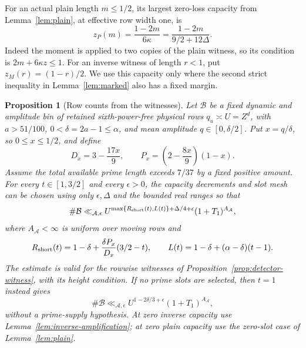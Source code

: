 \documentclass[11pt,a4paper]{article}
\numberwithin{equation}{section}
\numberwithin{figure}{section}
\newtheorem{proposition}[theorem]{Proposition}
\theoremstyle{definition}
\theoremstyle{remark}
\begin{document}
For an actual plain length \(m\le1/2\), its largest zero-loss
capacity from Lemma~\ref{lem:plain}, at effective row width one, is
\begin{equation}
 z_P(m)=\frac{1-2m}{6\kappa}
       =\frac{1-2m}{9/2+12\Delta}.
 \label{eq:plain-zero-loss-capacity}
\end{equation}
Indeed the moment is applied to two copies of the plain witness,
so its condition is \(2m+6\kappa z\le1\).
For an inverse witness of length \(r<1\), put
\(z_M(r)=(1-r)/2\).  We use this capacity only where the second
strict inequality in Lemma~\ref{lem:marked} also has a fixed margin.

\begin{proposition}[Row counts from the witnesses]\label{prop:detector-counts}
Let \(\mathcal B\) be a fixed dynamic and amplitude bin of retained
sixth-power-free physical rows \(q_u\asymp U=Z^d\), with
\(a>51/100\), \(0<\delta=2a-1\le\alpha\), and mean amplitude
\(q\in[0,\delta/2]\).  Put \(x=q/\delta\), so \(0\le x\le1/2\),
and define
\[
 D_x=3-\frac{17x}{9},\qquad
 P_x=\left(2-\frac{8x}{9}\right)(1-x).
\]
Assume the total available prime length exceeds \(7/37\) by a
fixed positive amount.  For every \(t\in[1,3/2]\) and every
\(\epsilon>0\), the capacity decrements and slot mesh can be chosen
using only \(\epsilon,\Delta\) and the bounded real ranges so that
\[
 \#\mathcal B\ll_{\mathcal A,\epsilon}
 U^{\max\{R_{\rm short}(t),L(t)\}+\Delta/4+\epsilon}
 (1+T_1)^{A_{\mathcal A}},
\]
where \(A_{\mathcal A}<\infty\) is uniform over moving rows and
\[
 R_{\rm short}(t)=1-\delta+\frac{\delta P_x}{D_x}(3/2-t),
 \qquad
 L(t)=1-\delta+(\alpha-\delta)(t-1).
\]
The estimate is valid for the rowwise witnesses of
Proposition~\ref{prop:detector-witness}, with its height condition.
If no prime slots are selected, then \(t=1\) instead gives
\[
 \#\mathcal B\ll_{\mathcal A,\epsilon}
 U^{1-2\delta/3+\epsilon}(1+T_1)^{A_{\mathcal A}},
\]
without a prime-supply hypothesis.  At zero inverse capacity use
Lemma~\ref{lem:inverse-amplification}; at zero plain capacity use
the zero-slot case of Lemma~\ref{lem:plain}.
\end{proposition}
\end{document}
